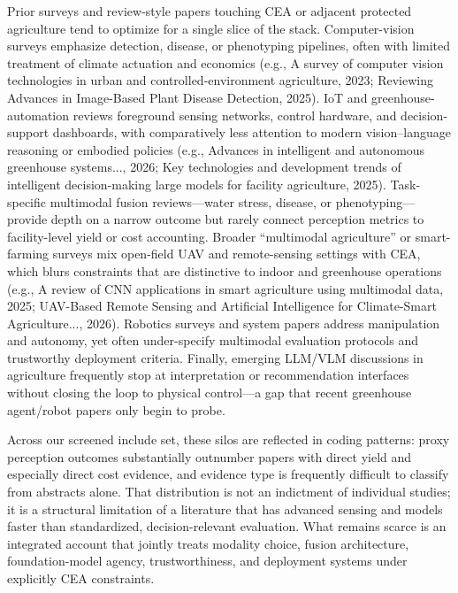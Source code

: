 \documentclass[lettersize,journal]{IEEEtran}
\begin{document}
Prior surveys and review-style papers touching CEA or adjacent protected agriculture tend to optimize for a single slice of the stack. Computer-vision surveys emphasize detection, disease, or phenotyping pipelines, often with limited treatment of climate actuation and economics (e.g., A survey of computer vision technologies in urban and controlled-environment agriculture, 2023; Reviewing Advances in Image-Based Plant Disease Detection, 2025). IoT and greenhouse-automation reviews foreground sensing networks, control hardware, and decision-support dashboards, with comparatively less attention to modern vision--language reasoning or embodied policies (e.g., Advances in intelligent and autonomous greenhouse systems..., 2026; Key technologies and development trends of intelligent decision-making large models for facility agriculture, 2025). Task-specific multimodal fusion reviews---water stress, disease, or phenotyping---provide depth on a narrow outcome but rarely connect perception metrics to facility-level yield or cost accounting. Broader ``multimodal agriculture'' or smart-farming surveys mix open-field UAV and remote-sensing settings with CEA, which blurs constraints that are distinctive to indoor and greenhouse operations (e.g., A review of CNN applications in smart agriculture using multimodal data, 2025; UAV-Based Remote Sensing and Artificial Intelligence for Climate-Smart Agriculture..., 2026). Robotics surveys and system papers address manipulation and autonomy, yet often under-specify multimodal evaluation protocols and trustworthy deployment criteria. Finally, emerging LLM/VLM discussions in agriculture frequently stop at interpretation or recommendation interfaces without closing the loop to physical control---a gap that recent greenhouse agent/robot papers only begin to probe.

Across our screened include set, these silos are reflected in coding patterns: proxy perception outcomes substantially outnumber papers with direct yield and especially direct cost evidence, and evidence type is frequently difficult to classify from abstracts alone. That distribution is not an indictment of individual studies; it is a structural limitation of a literature that has advanced sensing and models faster than standardized, decision-relevant evaluation. What remains scarce is an integrated account that jointly treats modality choice, fusion architecture, foundation-model agency, trustworthiness, and deployment systems under explicitly CEA constraints.

\end{document}
